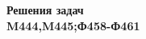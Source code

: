 

\titlespacing*{\section}{0pt}{0.1cm}{0cm}
\graphicspath{{image/}}
\renewcommand{\headrulewidth}{0pt}
\renewcommand{\footrulewidth}{0pt}


\pagestyle{fancy}
\fancyhf{} %
\fancyfoot[L]{\thepage} %
\fancyfoot[C]{} %
\fancyfoot[R]{} %
\setlength{\footskip}{15pt}


\begin{center}
    \huge
    \textbf{Решения задач}
    \\
    
    \Large
    \textbf{M444,M445;Ф458-Ф461}
\end{center}
\section*{}

